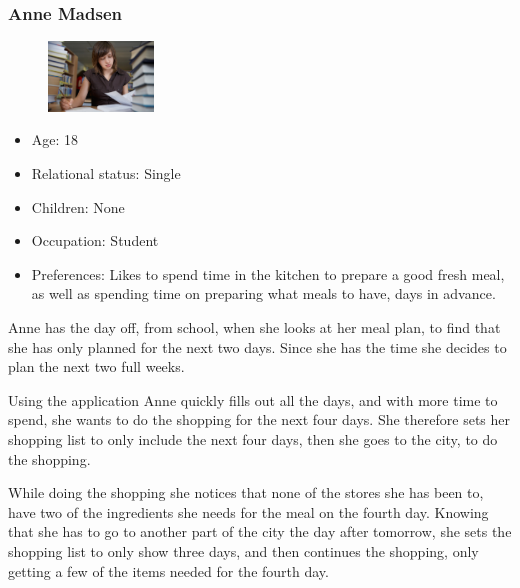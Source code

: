 \subsubsection{Anne Madsen}
\begin{figure}[H]
	\includegraphics[width=0.25\textwidth]{Grafik/FoodPlanner/PersonaAnneMadsen}
\end{figure}
\begin{itemize}
	\item Age: 18
	\item Relational status: Single
	\item Children: None
	\item Occupation: Student
	\item Preferences: Likes to spend time in the kitchen to prepare a good fresh meal, as well as spending time on preparing what meals to have, days in advance.
\end{itemize}
Anne has the day off, from school, when she looks at her meal plan, to find that she has only planned for the next two days. Since she has the time she decides to plan the next two full weeks.

Using the application Anne quickly fills out all the days, and with more time to spend, she wants to do the shopping for the next four days. She therefore sets her shopping list to only include the next four days, then she goes to the city, to do the shopping.

While doing the shopping she notices that none of the stores she has been to, have two of the ingredients she needs for the meal on the fourth day. Knowing that she has to go to another part of the city the day after tomorrow, she sets the shopping list to only show three days, and then continues the shopping, only getting a few of the items needed for the fourth day.